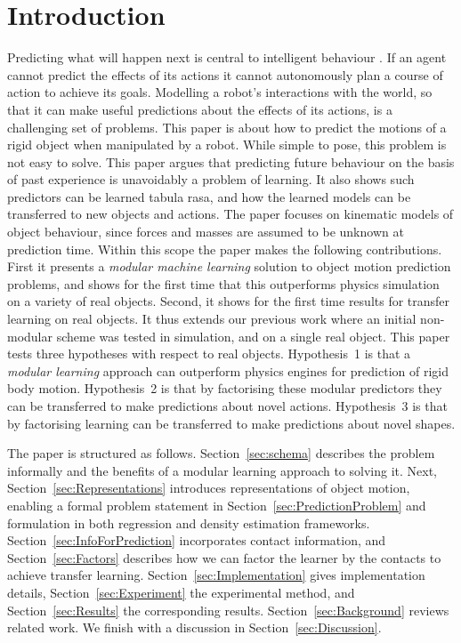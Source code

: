 \section{Introduction}\label{sec:Introduction}

Predicting what will happen next is central to intelligent behaviour \cite{craik1967nature}. If an agent cannot predict the effects of its actions it cannot autonomously plan a course of action to achieve its goals. Modelling a robot's interactions with the world, so that it can make useful predictions about the effects of its actions, is a challenging set of problems. This paper is about how to predict the motions of a rigid object when manipulated by a robot. While simple to pose, this problem is not easy to solve. This paper argues that predicting future behaviour on the basis of past experience is unavoidably a problem of learning. It also shows such predictors can be learned tabula rasa, and how the learned models can be transferred to new objects and actions. The paper focuses on kinematic models of object behaviour, since forces and masses are assumed to be unknown at prediction time. Within this scope the paper makes the following contributions. First it presents a {\em modular machine learning} solution to object motion prediction problems, and shows for the first time that this outperforms physics simulation on a variety of real objects.  Second, it shows for the first time results for transfer learning on real objects. It thus extends our previous work \cite{kopicki_prediction_2010,kopicki-etal-icra11}  where an initial non-modular scheme was tested in simulation, and on a single real object.  This paper tests three hypotheses with respect to real objects. Hypothesis~1 is that a {\em modular learning} approach can outperform physics engines for prediction of rigid body motion.  Hypothesis~2 is that by factorising these modular predictors they can be transferred to make predictions about novel actions. Hypothesis~3 is that by factorising learning can be transferred  to make predictions about novel shapes.

The paper is structured as follows.  Section~\ref{sec:schema} describes the problem informally and the benefits of a modular learning approach to solving it. Next, Section~\ref{sec:Representations} introduces representations of object motion, enabling a formal problem statement in Section~\ref{sec:PredictionProblem} and formulation in both regression and density estimation frameworks. Section~\ref{sec:InfoForPrediction} incorporates contact information, and Section~\ref{sec:Factors} describes how we can factor the learner by the contacts to achieve transfer learning. Section~\ref{sec:Implementation} gives implementation details, Section~\ref{sec:Experiment} the experimental method, and Section~\ref{sec:Results}
the corresponding results. Section~\ref{sec:Background} reviews related work.  We finish with a discussion in Section~\ref{sec:Discussion}.